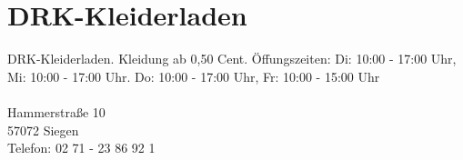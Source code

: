 \section{DRK-Kleiderladen }
DRK-Kleiderladen. Kleidung ab 0,50 Cent. Öffungszeiten: Di:  10:00 - 17:00 Uhr, Mi:  10:00 - 17:00 Uhr. Do: 10:00 - 17:00 Uhr, Fr:  10:00 - 15:00 Uhr\\
\\
Hammerstraße 10\\
57072 Siegen\\
Telefon: 02 71 - 23 86 92 1 